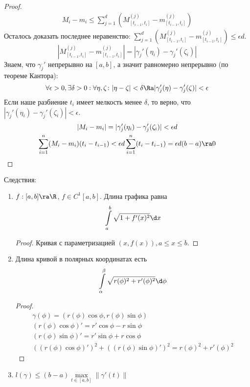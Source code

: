 \begin{proof}
\begin{gather*}
		M_i - m_i \le \sum\limits_{j = 1}^d (M_{[t_{i - 1}, t_{i}]}^{(j)} - m_{[t_{i - 1}, t_{i}]}^{(j)})
	\end{gather*}
	Осталось доказать последнее неравенство: $\sum\limits_{j = 1}^d (M_{[t_{i - 1}, t_{i}]}^{(j)} - m_{[t_{i - 1}, t_{i}]}^{(j)}) \le \epsilon d$.
	\[ \left |M_{[t_{i - 1}, t_{i}]}^{(j)} - m_{[t_{i - 1}, t_{i}]}^{(j)} \right| = |\gamma_j'(\eta_i) - \gamma_j'(\zeta_i)| \]
	Знаем, что $\gamma_j'$ непрерывно на $[a, b]$, а значит равномерно непрерывно (по теореме Кантора):
	\[ \forall \epsilon > 0, \exists \delta > 0: \forall \eta, \zeta \colon |\eta - \zeta| < \delta \Ra |\gamma_j'(\eta) - \gamma_j'(\zeta)| < \epsilon \]
	Если наше разбиение ${t_i}$ имеет мелкость менее $\delta$, то верно, что $|\gamma_j'(\eta_i) - \gamma_j'(\zeta_i)| < \epsilon$.
	\begin{gather*}
		|M_i - m_i| = |\gamma_j'(\eta_i) - \gamma_j'(\zeta_i)| < \epsilon d \\
		\sum\limits_{i = 1}^n (M_i - m_i)(t_i - t_{i - 1}) < \epsilon d \sum\limits_{i = 1}^n (t_i - t_{i - 1}) = \epsilon d (b - a) \ra 0
	\end{gather*}
\end{proof}

Следствия:
\begin{enumerate}
	\item
		$f: [a,b] \ra \R$, $f \in C^1[a,b]$. Длина графика равна
		\[ \int\limits_a^b \sqrt{1 + f'(x)^2} \d x \]
		\begin{proof}
			Кривая с параметризацией $(x, f(x)), a \le x \le b$.
		\end{proof}

	\item
		Длина кривой в полярных координатах есть
		\[ \int\limits_\alpha^\beta \sqrt{r(\phi)^2 + r'(\phi)^2} \d\phi \]
		\begin{proof}
			\begin{gather*}
				\gamma(\phi) = (r(\phi) \cos \phi, r(\phi) \sin \phi) \\
				(r(\phi) \cos \phi)' = r' \cos \phi - r \sin \phi \\
				(r(\phi) \sin \phi)' = r' \sin \phi + r \cos \phi \\
				((r(\phi) \cos \phi)')^2 + ((r(\phi) \sin \phi)')^2 = r(\phi)^2 + r'(\phi)^2
			\end{gather*}
		\end{proof}

	\item
		$l(\gamma) \le (b-a) \max\limits_{t \in [a,b]} \|\gamma'(t)\|$
\end{enumerate}

